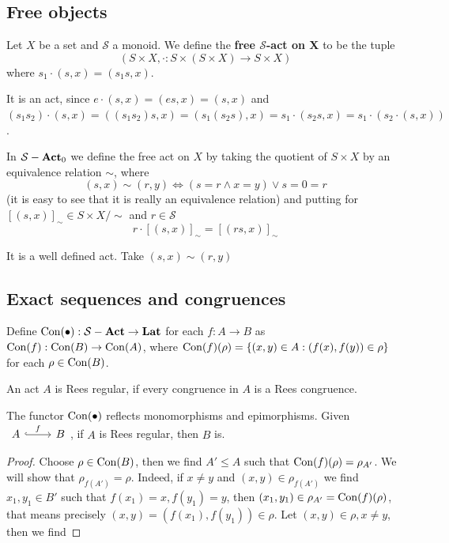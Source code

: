 \subsection{Free objects}
    \begin{definition}
        Let $X$ be a set and $\mathcal{S}$ a monoid. We define the \textbf{free $\mathcal{S}$-act on X} to be 
        the tuple  
        \[(S\times X,\cdot : S\times (S\times X) \to S\times X)\]
        where $s_1\cdot (s,x) = (s_1s,x)$.
    \end{definition}
    It is an act, since $e\cdot(s,x) = (es,x) = (s,x)$ and $(s_1s_2)\cdot(s,x) = 
    ((s_1s_2)s,x) = (s_1(s_2s),x) = s_1\cdot(s_2s,x) = s_1\cdot(s_2\cdot(s,x))$.
    \begin{definition}
        In $\mathcal{S}-\mathrm{\textbf{Act}}_0$ we define the free act on $X$ by taking the quotient of 
        $S\times X$ by an equivalence relation $\sim$, where 
        \[
            (s,x)\sim (r,y) \iff (s=r \land x=y) \lor s=0=r
        \]
        (it is easy to see that it is really an equivalence relation)
        and putting for $[(s,x)]_\sim\in S\times X/\sim$ and $r\in\mathcal{S}$
        \[
            r\cdot[(s,x)]_\sim = [(rs,x)]_\sim
        \]    
    \end{definition}
    \begin{remark}
        It is a well defined act. Take $(s,x)\sim(r,y)$
    \end{remark}
\fi
\subsection{Exact sequences and congruences}
\begin{definition}
    Define $\mathrm{Con}(\bullet) :\mathcal{S}-\mathrm{\textbf{Act}}\to\mathrm{\textbf{Lat}}$ for each $f:A\to B$ as
    $\mathrm{Con}(f):\mathrm{Con}(B)\to\mathrm{Con}(A)$, where $\mathrm{Con}(f)(\rho) = \{(x,y)\in A : (f(x),f(y))\in\rho\}$ 
    for each $\rho\in\mathrm{Con}(B)$.
\end{definition}
\begin{definition}
    An act $A$ is Rees regular, if every congruence in $A$ is a Rees congruence.
\end{definition}
\begin{proposition}
    The functor $\mathrm{Con}(\bullet)$ reflects monomorphisms and epimorphisms.
    Given $\begin{tikzcd}
	A & B
	\arrow["f", hook, from=1-1, to=1-2]
\end{tikzcd}$, if $A$ is Rees regular, then $B$ is.
\end{proposition}
\begin{proof}[Proof]
    Choose $\rho\in\mathrm{Con}(B)$, then we find $A'\leq A$ such that 
    $\mathrm{Con}(f)(\rho)=\rho_{A'}$. We will show that $\rho_{f(A')} = \rho$. Indeed, 
    if $x\neq y$ and $(x,y)\in\rho_{f(A')}$ we find $x_1,y_1\in B'$ such that 
    $f(x_1)=x,f(y_1)=y$, then $(x_1,y_1)\in\rho_{A'}=\mathrm{Con}(f)(\rho)$, that means precisely 
    $(x,y)=(f(x_1),f(y_1))\in\rho$. Let $(x,y)\in\rho,x\neq y$, then we find 
\end{proof}
